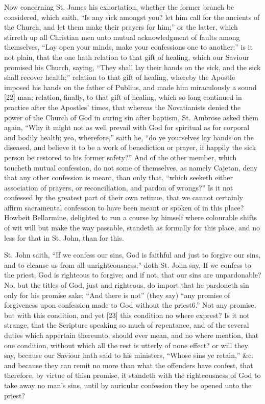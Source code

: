 Now concerning St. James his exhortation, whether the former branch be considered, which saith, “Is any sick amongst you? let him call for the ancients of the Church, and let them make their prayers for him;” or the latter, which stirreth up all Christian men unto mutual acknowledgment of faults among themselves, “Lay open your minds, make your confessions one to another;” is it not plain, that the one hath relation to that gift of healing, which our Saviour promised his Church, saying, “They shall lay their hands on the sick, and the sick shall recover health;” relation to that gift of healing, whereby the Apostle imposed his hands on the father of Publius, and made him miraculously a sound [22] man; relation, finally, to that gift of healing, which so long continued in practice after the Apostles’ times, that whereas the Novatianists denied the power of the Church of God in curing sin after baptism, St. Ambrose asked them again, “Why it might not as well prevail with God for spiritual as for corporal and bodily health; yea, wherefore,” saith he, “do ye yourselves lay hands on the diseased, and believe it to be a work of benediction or prayer, if happily the sick person be restored to his former safety?” And of the other member, which toucheth mutual confession, do not some of themselves, as namely Cajetan, deny that any other confession is meant, than only that, “which seeketh either association of prayers, or reconciliation, and pardon of wrongs?” Is it not confessed by the greatest part of their own retinue, that we cannot certainly affirm sacramental confession to have been meant or spoken of in this place? Howbeit Bellarmine, delighted to run a course by himself where colourable shifts of wit will but make the way passable, standeth as formally for this place, and no less for that in St. John, than for this.

St. John saith, “If we confess our sins, God is faithful and just to forgive our sins, and to cleanse us from all unrighteousness;” doth St. John say, If we confess to the priest, God is righteous to forgive; and if not, that our sins are unpardonable? No, but the titles of God, just and righteous, do import that he pardoneth sin only for his promise sake; “And there is not” (they say) “any promise of forgiveness upon confession made to God without the priest6.” Not any promise, but with this condition, and yet [23] this condition no where exprest? Is it not strange, that the Scripture speaking so much of repentance, and of the several duties which appertain thereunto, should ever mean, and no where mention, that one condition, without which all the rest is utterly of none effect? or will they say, because our Saviour hath said to his ministers, “Whose sins ye retain,” &c. and because they can remit no more than what the offenders have confest, that therefore, by virtue of thisn promise, it standeth with the righteousness of God to take away no man’s sins, until by auricular confession they be opened unto the priest?

